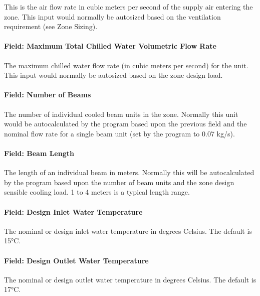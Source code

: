 This is the air flow rate in cubic meters per second of the supply air entering the zone. This input would normally be autosized based on the ventilation requirement (see Zone Sizing).

\paragraph{Field: Maximum Total Chilled Water Volumetric Flow Rate}\label{field-maximum-total-chilled-water-volumetric-flow-rate}

The maximum chilled water flow rate (in cubic meters per second) for the unit. This input would normally be autosized based on the zone design load.

\paragraph{Field: Number of Beams}\label{field-number-of-beams}

The number of individual cooled beam units in the zone. Normally this unit would be autocalculated by the program based upon the previous field and the nominal flow rate for a single beam unit (set by the program to 0.07 kg/s).

\paragraph{Field: Beam Length}\label{field-beam-length}

The length of an individual beam in meters. Normally this will be autocalculated by the program based upon the number of beam units and the zone design sensible cooling load. 1 to 4 meters is a typical length range.

\paragraph{Field: Design Inlet Water Temperature}\label{field-design-inlet-water-temperature}

The nominal or design inlet water temperature in degrees Celsius. The default is 15°C.

\paragraph{Field: Design Outlet Water Temperature}\label{field-design-outlet-water-temperature}

The nominal or design outlet water temperature in degrees Celsius. The default is 17°C.

